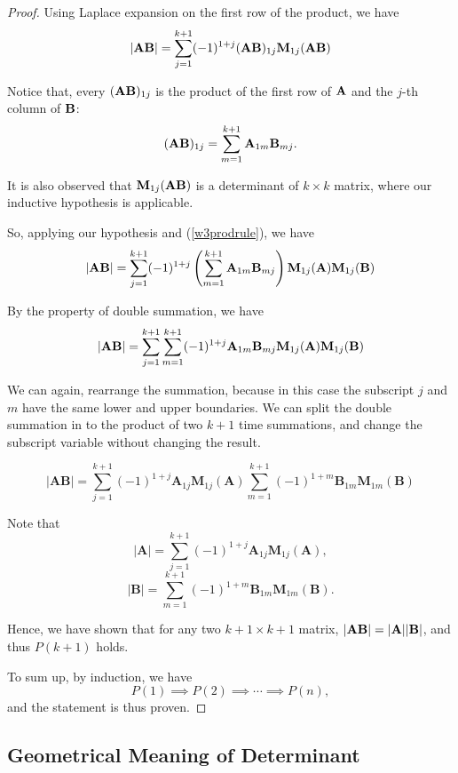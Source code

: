 \documentclass[12pt,a4paper]{article}
\begin{document}
\begin{proof}
Using Laplace expansion on the first row of the product, we have
\[
|\mathbf{A} \mathbf{B}|=\sum_{j=1}^{k+1}(-1)^{1+j}(\mathbf{A} \mathbf{B})_{1 j} \mathbf{M}_{1 j}(\mathbf{A} \mathbf{B})
\]

Notice that, every $(\mathbf{A} \mathbf{B})_{1 j}$ is the product of the first row of $\mathbf{A}$ and the $j$-th column of $\mathbf{B}$:
\begin{equation}\label{w3prodrule}
    (\mathbf{AB})_{1 j}=\sum_{m=1}^{k+1} \mathbf{A}_{1 m} \mathbf{B}_{m j}.
\end{equation}

It is also observed that $\mathbf{M}_{1 j}(\mathbf{A} \mathbf{B})$ is a determinant of $k\times k$ matrix, where our inductive hypothesis is applicable.

So, applying our hypothesis and (\ref{w3prodrule}), we have
\begin{equation}
    |\mathbf{A} \mathbf{B}|=\sum_{j=1}^{k+1}(-1)^{1+j}\left(\sum_{m=1}^{k+1} \mathbf{A}_{1 m} \mathbf{B}_{m j}\right)
    \mathbf{M}_{1 j}(\mathbf{A})\mathbf{M}_{1 j}(\mathbf{B})
\end{equation}

By the property of double summation, we have
\[
|\mathbf{AB}|=
\sum_{j=1}^{k+1} \sum_{m=1}^{k+1} (-1)^{1+j}\mathbf{A}_{1 m} \mathbf{B}_{m j}\mathbf{M}_{1 j}(\mathbf{A})\mathbf{M}_{1 j}(\mathbf{B})
\]

We can again, rearrange the summation, because in this case the subscript $j$ and $m$ have the same lower and upper boundaries. We can split the double summation in to the product of two $k+1$ time summations, and change the subscript variable without changing the result.

\[
|\mathbf{AB}| = 
\sum_{j=1}^{k+1}(-1)^{1+j}\mathbf{A}_{1 j}\mathbf{M}_{1 j}(\mathbf{A})
\sum_{m=1}^{k+1} (-1)^{1+m}\mathbf{B}_{1 m}\mathbf{M}_{1 m}(\mathbf{B})
\]

Note that
\[
|\mathbf{A}| = \sum_{j=1}^{k+1}(-1)^{1+j}\mathbf{A}_{1 j}\mathbf{M}_{1 j}(\mathbf{A}),
\] 
\[
|\mathbf{B}| = \sum_{m=1}^{k+1} (-1)^{1+m}\mathbf{B}_{1 m}\mathbf{M}_{1 m}(\mathbf{B}).
\]

Hence, we have shown that for any two $k+1\times k+1$ matrix, $|\mathbf{A}\mathbf{B}| = |\mathbf{A}||\mathbf{B}|$, and thus $P(k+1)$ holds.

To sum up, by induction, we have 
\[
P(1) \implies P(2)\implies \cdots \implies P(n),
\]
and the statement is thus proven.
\end{proof}

\subsection*{Geometrical Meaning of Determinant}
\end{document}
